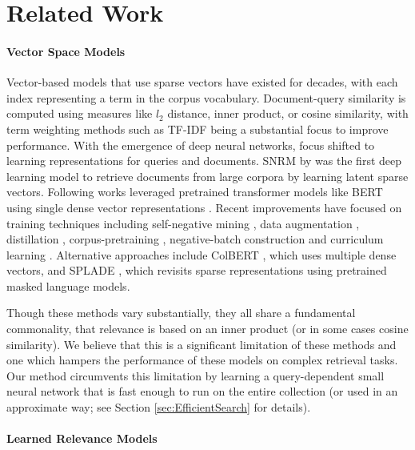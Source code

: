 \section{Related Work}
\paragraph{\textbf{Vector Space Models}}

Vector-based models that use sparse vectors have existed for decades, with each index representing a term in the corpus vocabulary. Document-query similarity is computed using measures like $l_2$ distance, inner product, or cosine similarity, with term weighting methods such as TF-IDF being a substantial focus to improve performance. With the emergence of deep neural networks, focus shifted to learning representations for queries and documents. SNRM by \citet{SNRM} was the first deep learning model to retrieve documents from large corpora by learning latent sparse vectors. Following works leveraged pretrained transformer models like BERT \cite{BERT} using single dense vector representations \cite{DPR}. Recent improvements have focused on training techniques including self-negative mining \cite{ANCE, RocketQA, RANCE, adore}, data augmentation \cite{RocketQA, DRAGON}, distillation \cite{MarginMSE, DRAGON, TCT-ColBERT}, corpus-pretraining \cite{CoCondensor, Contriever, RetroMAE,b-prop}, negative-batch construction \cite{TAS-B} and curriculum learning \cite{CL-DRD,prod}. Alternative approaches include ColBERT \cite{ColBERT_v1}, which uses multiple dense vectors, and SPLADE \cite{SPLADE}, which revisits sparse representations using pretrained masked language models.

Though these methods vary substantially, they all share a fundamental commonality, that relevance is based on an inner product (or in some cases cosine similarity). We believe that this is a significant limitation of these methods and one which hampers the performance of these models on complex retrieval tasks. Our method circumvents this limitation by learning a query-dependent small neural network that is fast enough to run on the entire collection (or used in an approximate way; see Section \ref{sec:EfficientSearch} for details).

\paragraph{\textbf{Learned Relevance Models}}

